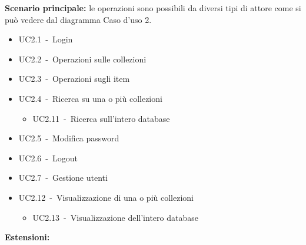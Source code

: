 \documentclass{scalatekids-article}
\begin{document}
\textbf{Scenario principale:} le operazioni sono possibili da diversi tipi di attore come si può vedere dal diagramma Caso d'uso 2.
\begin{itemize}
\item UC2.1\ -\ Login
\end{itemize}
\begin{itemize}
\item UC2.2\ -\ Operazioni sulle collezioni
\item UC2.3\ -\ Operazioni sugli item
\item UC2.4\ -\ Ricerca su una o più collezioni
  \begin{itemize}
  \item UC2.11\ -\ Ricerca sull'intero database
  \end{itemize}
\item UC2.5\ -\ Modifica password
\item UC2.6\ -\ Logout
\end{itemize}
\begin{itemize}
\item UC2.7\ -\ Gestione utenti
\item UC2.12\ -\ Visualizzazione di una o più collezioni
  \begin{itemize}
  \item UC2.13\ -\ Visualizzazione dell'intero database
  \end{itemize}
\end{itemize}
\textbf{Estensioni:}
\end{document}
